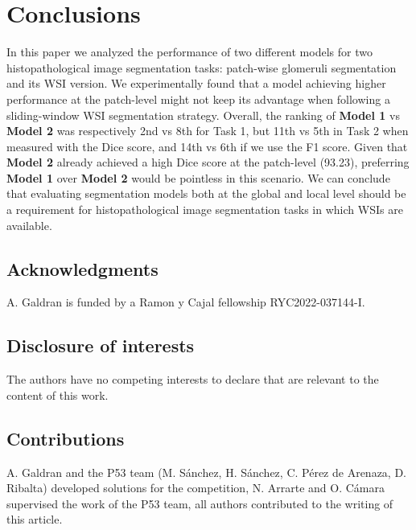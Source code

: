 \section{Conclusions}
In this paper we analyzed the performance of two different models for two histopathological image segmentation tasks: patch-wise glomeruli segmentation and its WSI version. 
We experimentally found that a model achieving higher performance at the patch-level might not keep its advantage when following a sliding-window WSI segmentation strategy. 
Overall, the ranking of \textbf{Model 1} vs \textbf{Model 2} was respectively 2nd vs 8th for Task 1, but 11th vs 5th in Task 2 when measured with the Dice score, and 14th vs 6th if we use the F1 score.
Given that \textbf{Model 2} already achieved a high Dice score at the patch-level (93.23), preferring \textbf{Model 1} over \textbf{Model 2} would be pointless in this scenario. 
We can conclude that evaluating segmentation models both at the global and local level should be a requirement for histopathological image segmentation tasks in which WSIs are available.


\subsection*{Acknowledgments}
A. Galdran is funded by a Ramon y Cajal fellowship RYC2022-037144-I.

\subsection*{Disclosure of interests}
The authors have no competing interests to declare that are relevant to the content of this work.

 \subsection*{Contributions}
A. Galdran and the P53 team (M. Sánchez, H. Sánchez, C. Pérez de Arenaza, D. Ribalta) developed solutions for the competition, N. Arrarte and O. Cámara supervised the work of the P53 team, all authors contributed to the writing of this article.


